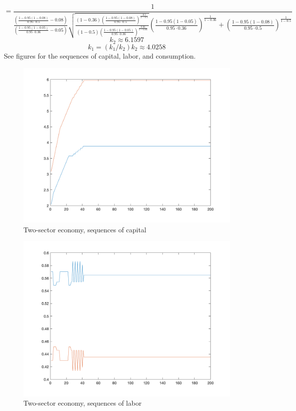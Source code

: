 \documentclass[10pt,letter]{article}
\begin{document}
\[ = \frac{1}{\frac{\left( \frac{1 - 0.95 (1-0.08)}{0.95\cdot  0.5} - 0.08 \right)}{\left( \frac{1 - 0.95 (1-0.05)}{0.95 \cdot 0.36}  - 0.05\right)}\sqrt{\frac{(1-0.36)  \left( \frac{1 -0.95 (1-0.08)}{0.95 \cdot 0.5} \right)^{\frac{0.5}{1-0.5}}}{(1-0.5)\left( \frac{1 - 0.95 (1-0.05)}{0.95 \cdot 0.36} \right)^{\frac{0.36}{1-0.36}}}} \left( \frac{1 - 0.95 (1-0.05)}{0.95 \cdot 0.36} \right)^{\frac{1}{1-0.36}} + \left( \frac{1 -0.95 (1-0.08)}{0.95 \cdot 0.5} \right)^{\frac{1}{1-0.5}}} \]
\[ k_2 \approx 6.1597 \]
\[ k_1 = (k_1/k_2)k_2 \approx 4.0258 \]
See figures for the sequences of capital, labor, and consumption.
\begin{figure}
\includegraphics[scale=0.8]{ps3q3_k}
\caption{Two-sector economy, sequences of capital}
\end{figure}
\begin{figure}
\includegraphics[scale=0.8]{ps3q3_l}
\caption{Two-sector economy, sequences of labor}
\end{figure}
\end{document}
